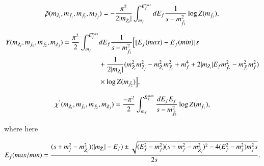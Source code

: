 \documentclass[final,3p,times]{elsarticle}
\begin{document}
\begin{equation} \label{rhotildaintegral}
\tilde{\rho}(m_{\tilde{Z}_i},m_{\tilde{f}_1},m_{\tilde{f}_2},m_{\tilde{Z}_j}) = -{\pi^2 \over 2 |m_{\tilde{Z}_i}|} \int_{m_{f}}^{E^{max}_{f}} dE_f {1 \over s-m_{\tilde{f}_1}^2} \log Z(m_{\tilde{f}_2}) ,
\end{equation}


\begin{equation} \label{Yintegral}
\begin{aligned}
Y(m_{\tilde{Z}_i},m_{\tilde{f}_1},m_{\tilde{f}_2},m_{\tilde{Z}_j}) = {\pi^2 \over 2} \int_{m_{f}}^{E^{max}_{f}} & dE_f {1 \over s-m_{\tilde{f}_1}^2}\Big[[E_{\bar{f}}(max) - E_{\bar{f}}(min)]s \\ & + {1 \over 2|m_{\tilde{Z}_i}|}(m_{\tilde{Z}_i}^2 m_{\tilde{Z}_j}^2 - m_{\tilde{Z}_i}^2 m_{\tilde{f}_2}^2 + m_{f}^4 + 2|m_{\tilde{Z}_i}|E_{f}m_{\tilde{f}_2}^2 - m_{\tilde{f}_2}^2 m_{f}^2) \\ & \times \log Z(m_{\tilde{f}_2})\Big] ,
\end{aligned}
\end{equation}


\begin{equation} \label{chiprimeintegral}
\chi^{'}(m_{\tilde{Z}_i},m_{\tilde{f}_1},m_{\tilde{f}_2},m_{\tilde{Z}_j}) = {-\pi^2 \over 2} \int_{m_{f}}^{E^{max}_{f}} {dE_f E_{f} \over s - m_{\tilde{f}_2}^2} \log Z(m_{\tilde{f}_1}),
\end{equation}

where here

\begin{equation} \label{Efbarmaxmin}
E_{\bar{f}}(max/min) = {(s + m_{f}^2 - m_{\tilde{Z}_j}^2)(|m_{\tilde{Z}_i}|-E_{f}) \pm \sqrt{(E_{f}^2 - m_{f}^2)(s + m_{f}^2 - m_{\tilde{Z}_j}^2)^2 - 4(E_{f}^2 - m_{f}^2)m_{f}^2 s} \over 2s}.
\end{equation}
\end{document}
